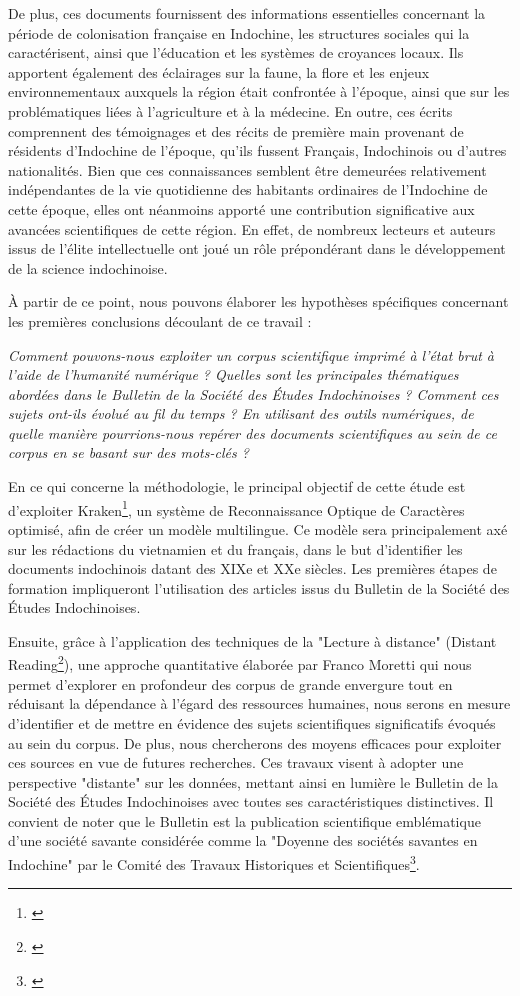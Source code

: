 De plus, ces documents fournissent des informations essentielles concernant la période de colonisation française en Indochine, les structures sociales qui la caractérisent, ainsi que l'éducation et les systèmes de croyances locaux. 
Ils apportent également des éclairages sur la faune, la flore et les enjeux environnementaux auxquels la région était confrontée à l'époque, ainsi que sur les problématiques liées à l'agriculture et à la médecine. 
En outre, ces écrits comprennent des témoignages et des récits de première main provenant de résidents d'Indochine de l'époque, qu'ils fussent Français, Indochinois ou d'autres nationalités. Bien que ces connaissances semblent être demeurées relativement indépendantes de la vie quotidienne des habitants ordinaires de l'Indochine de cette époque, elles ont néanmoins apporté une contribution significative aux avancées scientifiques de cette région. En effet, de nombreux lecteurs et auteurs issus de l'élite intellectuelle ont joué un rôle prépondérant dans le développement de la science indochinoise.


À partir de ce point, nous pouvons élaborer les hypothèses spécifiques concernant les premières conclusions découlant de ce travail : 

\textit{Comment pouvons-nous exploiter un corpus scientifique imprimé à l’état brut à l'aide de l'humanité numérique ? Quelles sont les principales thématiques abordées dans le Bulletin de la Société des Études Indochinoises ? Comment ces sujets ont-ils évolué au fil du temps ? En utilisant des outils numériques, de quelle manière pourrions-nous repérer des documents scientifiques au sein de ce corpus en se basant sur des mots-clés ?}

En ce qui concerne la méthodologie, le principal objectif de cette étude est d'exploiter Kraken\footnote{\cite{kraken}}, un système de Reconnaissance Optique de Caractères optimisé, afin de créer un modèle multilingue. Ce modèle sera principalement axé sur les rédactions du vietnamien et du français, dans le but d'identifier les documents indochinois datant des XIXe et XXe siècles. Les premières étapes de formation impliqueront l'utilisation des articles issus du Bulletin de la Société des Études Indochinoises.

Ensuite, grâce à l'application des techniques de la "Lecture à distance" (Distant Reading\footnote{\cite{distant}}), une approche quantitative élaborée par Franco Moretti qui nous permet d'explorer en profondeur des corpus de grande envergure tout en réduisant la dépendance à l'égard des ressources humaines, nous serons en mesure d'identifier et de mettre en évidence des sujets scientifiques significatifs évoqués au sein du corpus. De plus, nous chercherons des moyens efficaces pour exploiter ces sources en vue de futures recherches. Ces travaux visent à adopter une perspective "distante" sur les données, mettant ainsi en lumière le Bulletin de la Société des Études Indochinoises avec toutes ses caractéristiques distinctives. Il convient de noter que le Bulletin est la publication scientifique emblématique d'une société savante considérée comme la "Doyenne des sociétés savantes en Indochine" par le Comité des Travaux Historiques et Scientifiques\footnote{\cite{comite}}.

